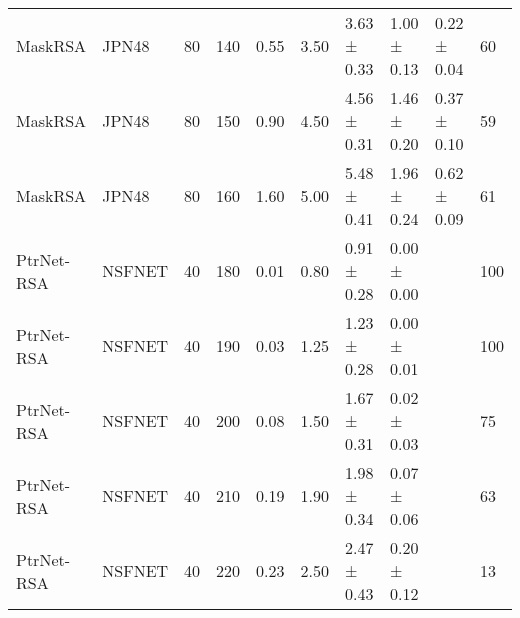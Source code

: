 \begin{longtable}[!htbp]{llll|lllll|l}
MaskRSA              & JPN48             & 80                   & 140                                                               & 0.55 & \multicolumn{1}{l|}{3.50}     & 3.63 ± 0.33 & 1.00 ± 0.13         & 0.22 ± 0.04       & 60                                                                                      \\
MaskRSA              & JPN48             & 80                   & 150                                                               & 0.90  & \multicolumn{1}{l|}{4.50}     & 4.56 ± 0.31 & 1.46 ± 0.20       & 0.37 ± 0.10        & 59                                                                                    \\
MaskRSA              & JPN48             & 80                   & 160                                                               & 1.60  & \multicolumn{1}{l|}{5.00}       & 5.48 ± 0.41 & 1.96 ± 0.24      & 0.62 ± 0.09       & 61                                                                                    \\
PtrNet-RSA           & NSFNET            & 40                   & 180                                                               & 0.01 & \multicolumn{1}{l|}{0.80}     & 0.91 ± 0.28 & 0.00 ± 0.00            &                   & 100                                                                                     \\
PtrNet-RSA           & NSFNET            & 40                   & 190                                                               & 0.03 & \multicolumn{1}{l|}{1.25}    & 1.23 ± 0.28 & 0.00 ± 0.01         &                   & 100                                                                                     \\
PtrNet-RSA           & NSFNET            & 40                   & 200                                                               & 0.08 & \multicolumn{1}{l|}{1.50}     & 1.67 ± 0.31 & 0.02 ± 0.03      &                   & 75                                                                                      \\
PtrNet-RSA           & NSFNET            & 40                   & 210                                                               & 0.19 & \multicolumn{1}{l|}{1.90}     & 1.98 ± 0.34 & 0.07 ± 0.06      &                   & 63                                                                                    \\
PtrNet-RSA           & NSFNET            & 40                   & 220                                                               & 0.23 & \multicolumn{1}{l|}{2.50}     & 2.47 ± 0.43 & 0.20 ± 0.12       &                   & 13                                                                                    \\

\end{longtable}
